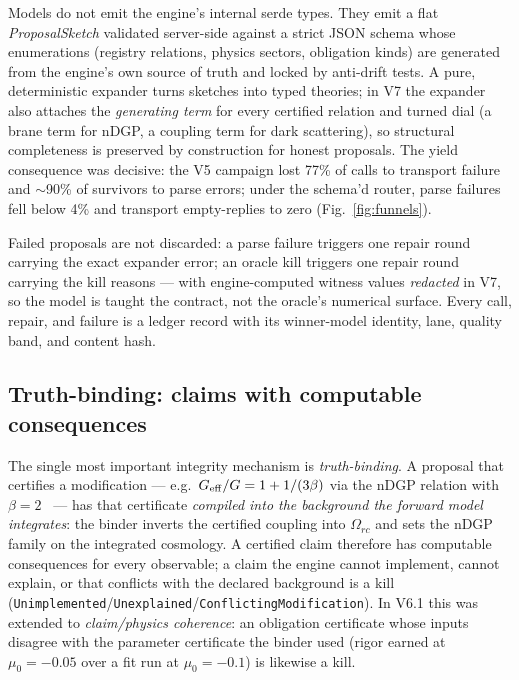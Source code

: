 \documentclass[journal]{IEEEtran}
\begin{document}
Models do not emit the engine's internal serde types. They emit a flat
\emph{ProposalSketch} validated server-side against a strict JSON schema whose
enumerations (registry relations, physics sectors, obligation kinds) are generated from
the engine's own source of truth and locked by anti-drift tests. A pure, deterministic
expander turns sketches into typed theories; in V7 the expander also attaches the
\emph{generating term} for every certified relation and turned dial (a brane term for
nDGP, a coupling term for dark scattering), so structural completeness is preserved by
construction for honest proposals. The yield consequence was decisive: the V5 campaign
lost 77\% of calls to transport failure and $\sim$90\% of survivors to parse errors;
under the schema'd router, parse failures fell below 4\% and transport empty-replies to
zero (Fig.~\ref{fig:funnels}).

Failed proposals are not discarded: a parse failure triggers one repair round carrying
the exact expander error; an oracle kill triggers one repair round carrying the kill
reasons --- with engine-computed witness values \emph{redacted} in V7, so the model is
taught the contract, not the oracle's numerical surface. Every call, repair, and failure
is a ledger record with its winner-model identity, lane, quality band, and content hash.

\subsection{Truth-binding: claims with computable consequences}
The single most important integrity mechanism is \emph{truth-binding}. A proposal that
certifies a modification --- e.g.\ $G_{\rm eff}/G = 1 + 1/(3\beta)$ via the nDGP relation
with $\beta=2$~\cite{koyama2006} --- has that certificate \emph{compiled into the
background the forward model integrates}: the binder inverts the certified coupling into
$\Omega_{rc}$ and sets the nDGP family on the integrated cosmology. A certified claim
therefore has computable consequences for every observable; a claim the engine cannot
implement, cannot explain, or that conflicts with the declared background is a kill
(\texttt{Unimplemented}/\texttt{Unexplained}/\texttt{ConflictingModification}). In V6.1
this was extended to \emph{claim/physics coherence}: an obligation certificate whose
inputs disagree with the parameter certificate the binder used (rigor earned at
$\mu_0{=}-0.05$ over a fit run at $\mu_0{=}-0.1$) is likewise a kill.
\end{document}
